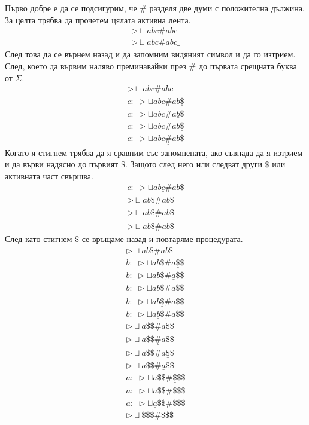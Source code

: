 \documentclass[14pt]{extarticle}
\begin{document}
Първо добре е да се подсигурим, че \(\#\) разделя две думи с положителна дължина.
За целта трябва да прочетем цялата активна лента.
\begin{align*}
    \triangleright \underline{\sqcup} abc \# abc \\
    \triangleright \sqcup abc \# abc\_
\end{align*}
След това да се върнем назад и да запомним видяният символ и да го изтрием.
След, което да вървим наляво преминавайки през \(\#\) до първата срещната буква от \(\Sigma\).
\begin{align*}
    \triangleright \sqcup abc \# ab\underline{c} \\
    c: \; \triangleright \sqcup abc \# ab\underline{\$} \\
    c: \; \triangleright \sqcup abc \# a\underline{b}\$ \\
    c: \; \triangleright \sqcup abc \# ab\underline{\$} \\
    c: \; \triangleright \sqcup abc \underline{\#} ab\$
\end{align*}
Когато я стигнем трябва да я сравним със запомнената, ако съвпада да я изтрием и да върви надясно до първият \(\$\).
Защото след него или следват други \(\$\) или активната част свършва.
\begin{align*}
    c: \; \triangleright \sqcup ab\underline{c} \# ab\$ \\
    \triangleright \sqcup ab\underline{\$} \# ab\$ \\
    \triangleright \sqcup ab\$ \underline{\#}ab\$ \\
    \triangleright \sqcup ab\$ \# ab\underline{\$}
\end{align*}
След като стигнем \(\$\) се връщаме назад и повтаряме процедурата.
\begin{align*}
    \triangleright \sqcup ab\$ \# a\underline{b}\$ \\
    b: \; \triangleright \sqcup ab\$ \# a\underline{\$}\$ \\
    b: \; \triangleright \sqcup ab\$ \# \underline{a}\$\$ \\
    b: \; \triangleright \sqcup ab\$ \underline{\#} a\$\$ \\
    b: \; \triangleright \sqcup ab\underline{\$}\# a\$\$ \\
    b: \; \triangleright \sqcup a\underline{b}\$\# a\$\$ \\
    \triangleright \sqcup a\underline{\$}\$ \# a\$\$ \\
    \triangleright \sqcup a\$\$ \underline{\#}a\$\$ \\
    \triangleright \sqcup a\$\$ \# a\underline{\$}\$ \\
    \triangleright \sqcup a\$\$ \# \underline{a}\$\$ \\
    a: \; \triangleright \sqcup a\$\$ \# \underline{\$}\$\$ \\
    a: \; \triangleright \sqcup a\underline{\$}\$ \# \$\$\$ \\
    a: \; \triangleright \sqcup \underline{a}\$\$ \# \$\$\$ \\
    \triangleright \sqcup \underline{\$}\$\$ \# \$\$\$ \\
\end{align*}
\end{document}
